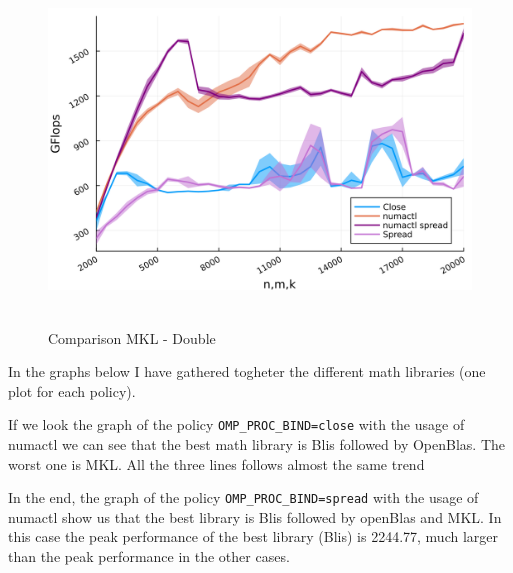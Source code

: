\documentclass[
  letterpaper,
  DIV=11,
  numbers=noendperiod]{scrartcl}
\begin{document}
\begin{figure}

{\centering \includegraphics[width=\textwidth,height=3.64583in]{img/double_mkl_comparison.png}

}

\caption{Comparison MKL - Double}

\end{figure}

\newpage

In the graphs below I have gathered togheter the different math
libraries (one plot for each policy).

If we look the graph of the policy \texttt{OMP\_PROC\_BIND=close} with
the usage of numactl we can see that the best math library is Blis
followed by OpenBlas. The worst one is MKL. All the three lines follows
almost the same trend

In the end, the graph of the policy \texttt{OMP\_PROC\_BIND=spread} with
the usage of numactl show us that the best library is Blis followed by
openBlas and MKL. In this case the peak performance of the best library
(Blis) is 2244.77, much larger than the peak performance in the other
cases.
\end{document}
